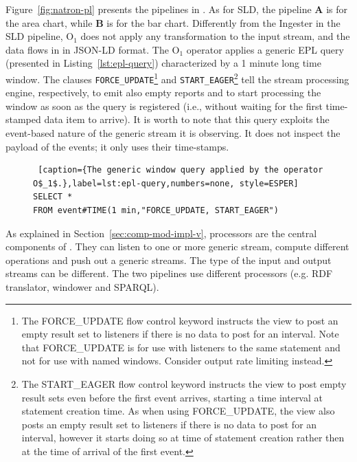 Figure~\ref{fig:natron-pl} presents the pipelines in \sti{}. As for SLD, the pipeline \textbf{A} is for the area chart, while \textbf{B} is for the bar chart. 
Differently from the \textsf{Ingester} in the SLD pipeline, O$_1$ does not apply any transformation to the input stream, and the data flows in \sti{} in JSON-LD format.
The O$_1$ operator applies a generic EPL query (presented in Listing~\ref{lst:epl-query}) characterized by a 1 minute long time window.
The clauses \texttt{FORCE\_UPDATE}\footnote{The FORCE\_UPDATE flow control keyword instructs the view to post an empty result set to listeners if there is no data to post for an interval. Note that FORCE\_UPDATE is for use with listeners to the same statement and not for use with named windows. Consider output rate limiting instead.} and \texttt{START\_EAGER}\footnote{The START\_EAGER flow control keyword instructs the view to post empty result sets even before the first event arrives, starting a time interval at statement creation time. As when using FORCE\_UPDATE, the view also posts an empty result set to listeners if there is no data to post for an interval, however it starts doing so at time of statement creation rather then at the time of arrival of the first event.} tell the stream processing engine, respectively, to emit also empty reports and to start processing the window as soon as the query is registered (i.e., without waiting for the first time-stamped data item to arrive).
It is worth to note that this query exploits the event-based nature of the generic stream it is observing.
It does not inspect the payload of the events; it only uses their time-stamps.

\begin{figure}[ht]
\begin{minipage}{0.95\linewidth}
\begin{lstlisting} [caption={The generic window query applied by the operator O$_1$.},label=lst:epl-query,numbers=none, style=ESPER]
SELECT * 
FROM event#TIME(1 min,"FORCE_UPDATE, START_EAGER")
\end{lstlisting}
\end{minipage}
\end{figure}

As explained in Section~\ref{sec:comp-mod-impl-v}, processors are the central components of \sti{}. They can listen to one or more generic stream, compute different operations and push out a generic streams. The type of the input and output streams can be different. The two pipelines use different processors (e.g. RDF translator, windower and SPARQL).

